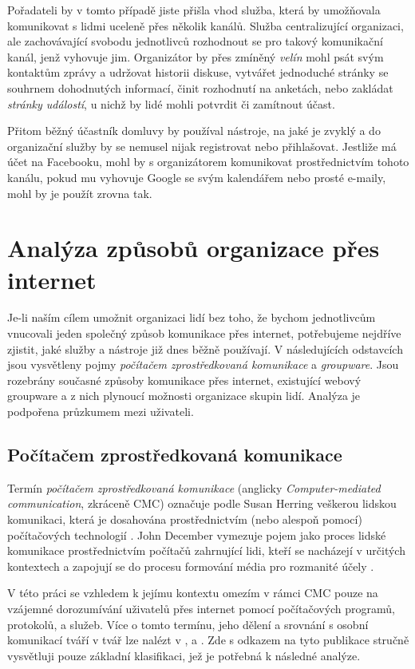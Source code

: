\documentclass[12pt,oneside,final]{fithesis2}
\begin{document}
Pořadateli by v tomto případě jiste přišla vhod služba, která by u\-mož\-ňo\-va\-la komunikovat s lidmi uceleně přes několik kanálů. Služba centralizující organizaci, ale zachovávající svobodu jednotlivců rozhodnout se pro takový komunikační kanál, jenž vyhovuje jim. Organizátor by přes zmíněný {\it velín} mohl psát svým kontaktům zprávy a udržovat historii diskuse, vytvářet jednoduché stránky se souhrnem dohodnutých informací, činit rozhodnutí na anketách, nebo zakládat {\it stránky událostí}, u nichž by lidé mohli potvrdit či zamítnout účast.

Přitom běžný účastník domluvy by používal nástroje, na jaké je zvyklý a do organizační služby by se nemusel nijak registrovat nebo přihlašovat. Jestliže má účet na Facebooku, mohl by s organizátorem komunikovat pro\-střed\-nic\-tvím tohoto kanálu, pokud mu vyhovuje Google se svým kalendářem nebo prosté e-maily, mohl by je použít zrovna tak.



\chapter{Analýza způsobů organizace přes internet}\label{analysis}
Je-li naším cílem umožnit organizaci lidí bez toho, že bychom jednotlivcům vnucovali jeden společný způsob komunikace přes internet, potřebujeme nejdříve zjistit, jaké služby a nástroje již dnes běžně používají. V následujících odstavcích jsou vysvětleny pojmy {\it počítačem zprostředkovaná komunikace} a {\it groupware}. Jsou rozebrány současné způsoby komunikace přes internet, existující webový groupware a z nich plynoucí možnosti organizace skupin lidí. Analýza je podpořena průzkumem mezi uživateli.

\section{Počítačem zprostředkovaná komunikace}\label{cmc}
Termín {\it počítačem zprostředkovaná komunikace} (anglicky {\it Computer-mediated communication}, zkráceně CMC) označuje podle Susan Herring veškerou lidskou komunikaci, která je dosahována prostřednictvím (nebo alespoň pomocí) počítačových technologií \cite{thurlow2004computer}. John December vymezuje pojem jako proces lidské komunikace prostřednictvím počítačů zahrnující lidi, kteří se nacházejí v určitých kontextech a zapojují se do procesu formování média pro rozmanité účely \cite{december1997notes}.

V této práci se vzhledem k jejímu kontextu omezím v rámci CMC pouze na vzájemné dorozumívání uživatelů přes internet pomocí počítačových programů, protokolů, a služeb. Více o tomto termínu, jeho dělení a srovnání s osobní komunikací tváří v tvář lze nalézt v \cite{thurlow2004computer}, \cite{rulik2006computer} a \cite{bordia1997face}. Zde s odkazem na tyto publikace stručně vysvětluji pouze základní klasifikaci, jež je potřebná k následné analýze.
\end{document}
